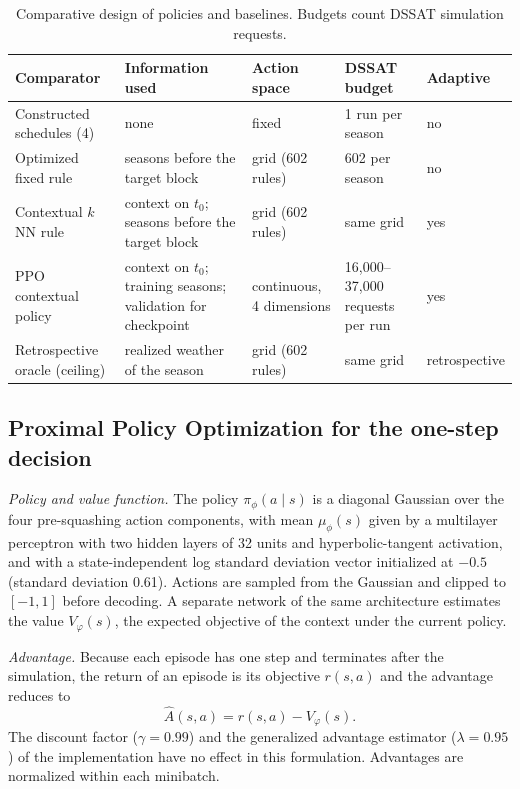 \documentclass[times,final,authoryear]{elsarticle}
\begin{document}
\begin{table}[!h]
\centering
\footnotesize
\caption{Comparative design of policies and baselines. Budgets count DSSAT simulation requests.}
\label{tab_design}
\begin{tabular}{p{3.6cm}p{3.6cm}p{2.4cm}p{3.0cm}p{1.4cm}}
\hline
Comparator & Information used & Action space & DSSAT budget & Adaptive \\
\hline
Constructed schedules (4) & none & fixed & 1 run per season & no \\
Optimized fixed rule & seasons before the target block & grid (602 rules) & 602 per season & no \\
Contextual $k$NN rule & context on $t_0$; seasons before the target block & grid (602 rules) & same grid & yes \\
PPO contextual policy & context on $t_0$; training seasons; validation for checkpoint & continuous, 4 dimensions & 16,000--37,000 requests per run & yes \\
Retrospective oracle (ceiling) & realized weather of the season & grid (602 rules) & same grid & retrospective \\
\hline
\end{tabular}
\end{table}

\subsection{Proximal Policy Optimization for the one-step decision}
\label{subppo}

\emph{Policy and value function.} The policy $\pi_\phi(a \mid s)$ is a diagonal Gaussian over the four pre-squashing action components, with mean $\mu_\phi(s)$ given by a multilayer perceptron with two hidden layers of 32 units and hyperbolic-tangent activation, and with a state-independent log standard deviation vector initialized at $-0.5$ (standard deviation 0.61). Actions are sampled from the Gaussian and clipped to $[-1,1]$ before decoding. A separate network of the same architecture estimates the value $V_\varphi(s)$, the expected objective of the context under the current policy.

\emph{Advantage.} Because each episode has one step and terminates after the simulation, the return of an episode is its objective $r(s,a)$ and the advantage reduces to
\begin{equation}
\hat{A}(s,a) = r(s,a) - V_\varphi(s).
\label{eq_advantage}
\end{equation}
The discount factor ($\gamma = 0.99$) and the generalized advantage estimator ($\lambda = 0.95$) of the implementation have no effect in this formulation. Advantages are normalized within each minibatch.
\end{document}
